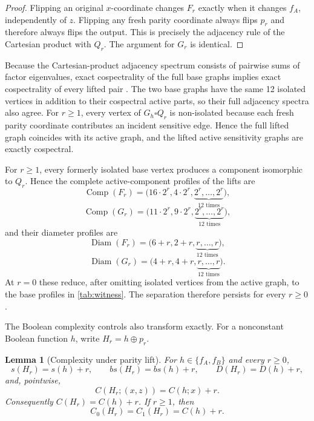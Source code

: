 \documentclass[twoside,12pt,letterpaper]{article}
\newtheorem{lemma}{Lemma}
\theoremstyle{definition}
\begin{document}
\begin{proof}
Flipping an original $x$-coordinate changes $F_r$ exactly when it changes $f_A$, independently of $z$. Flipping any fresh parity coordinate always flips $p_r$ and therefore always flips the output. This is precisely the adjacency rule of the Cartesian product with $Q_r$. The argument for $G_r$ is identical.
\end{proof}

Because the Cartesian-product adjacency spectrum consists of pairwise sums of factor eigenvalues, exact cospectrality of the full base graphs implies exact cospectrality of every lifted pair \parencite{imrich2008,hammack2011}. The two base graphs have the same 12 isolated vertices in addition to their cospectral active parts, so their full adjacency spectra also agree. For $r\ge1$, every vertex of $G_h\square Q_r$ is non-isolated because each fresh parity coordinate contributes an incident sensitive edge. Hence the full lifted graph coincides with its active graph, and the lifted active sensitivity graphs are exactly cospectral.

For $r\ge1$, every formerly isolated base vertex produces a component isomorphic to $Q_r$. Hence the complete active-component profiles of the lifts are
\[
\operatorname{Comp}(F_r)=\bigl(16\cdot2^r,4\cdot2^r,\underbrace{2^r,\ldots,2^r}_{12\text{ times}}\bigr),
\]
\[
\operatorname{Comp}(G_r)=\bigl(11\cdot2^r,9\cdot2^r,\underbrace{2^r,\ldots,2^r}_{12\text{ times}}\bigr),
\]
and their diameter profiles are
\[
\operatorname{Diam}(F_r)=\bigl(6+r,2+r,\underbrace{r,\ldots,r}_{12\text{ times}}\bigr),
\]
\[
\operatorname{Diam}(G_r)=\bigl(4+r,4+r,\underbrace{r,\ldots,r}_{12\text{ times}}\bigr).
\]
At $r=0$ these reduce, after omitting isolated vertices from the active graph, to the base profiles in \cref{tab:witness}. The separation therefore persists for every $r\ge0$.

The Boolean complexity controls also transform exactly. For a nonconstant Boolean function $h$, write $H_r=h\oplus p_r$.

\begin{lemma}[Complexity under parity lift]
For $h\in\{f_A,f_B\}$ and every $r\ge0$,
\[
s(H_r)=s(h)+r,\qquad bs(H_r)=bs(h)+r,\qquad D(H_r)=D(h)+r,
\]
and, pointwise,
\[
C(H_r;(x,z))=C(h;x)+r.
\]
Consequently $C(H_r)=C(h)+r$. If $r\ge1$, then
\[
C_0(H_r)=C_1(H_r)=C(h)+r.
\]
\end{lemma}
\end{document}
